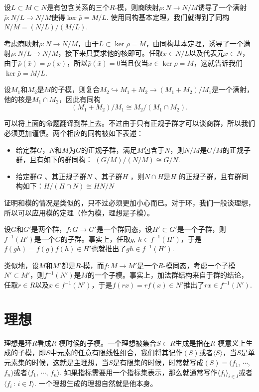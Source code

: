 \para 设$L\subset M \subset N$是有包含关系的三个$R$-模，则商映射$\rho:N\to N/M$诱导了一个满射$\bar{\rho}:N/L \to N/M$使得$\ker \bar{\rho}=M/L$. 使用同构基本定理，我们就得到了同构$N/M=(N/L)/(M/L)$.

考虑商映射$\rho:N\to N/M$，由于$L\subset \ker \rho=M$，由同构基本定理，诱导了一个满射$\bar{\rho}:N/L \to N/M$，接下来只要求他的核即可。任取$\bar{x}\in N/L$以及代表元$x\in N$，由于$\bar{\rho}(\bar{x})=\rho(x)$，所以$\bar{\rho} (\bar{x})=0$当且仅当$x\in \ker \rho =M$，这就告诉我们$\ker \bar{\rho}=M/L$.

\para \label{modiso1}设$M_1$和$M_2$是$M$的子模，则复合$M_2\hookrightarrow M_1+M_2 \to (M_1+M_2)/M_1$是一个满射，他的核是$M_1\cap M_2$，因此有同构
\[
	(M_1+M_2)/M_1\cong M_2/(M_1\cap M_2).
\]

\para 可以将上面的命题翻译到群上去。不过由于只有正规子群才可以谈商群，所以我们必须更加谨慎。两个相应的同构被如下表述：

\begin{itemize}
\item 给定群$G$，$N$和$M$为$G$的正规子群，满足$M$包含于$N$，则$N/M$是$G/M$的正规子群，且有如下的群同构： $ (G/M)/(N/M)\cong G/N$.

\item 给定群$G$ 、其正规子群$N$ 、其子群$H$ ，则$N\cap H$是$H$ 的正规子群，且有群同构如下：$H/(H\cap N)\cong HN/N$
\end{itemize}

证明和模的情况是类似的，只不过必须更加小心而已。对于环，我们一般谈理想，所以可以应用模的定理（作为模，理想是子模）。

\para 设$G$和$G'$是两个群，$f:G\to G'$是一个群同态，设$H'\subset G'$是一个子群，则$f^{-1}(H')$是一个$G$的子群。事实上，任取$g$, $h\in f^{-1}(H')$，于是$f(gh)=f(g)f(h)\in H'$也就推出了$gh\in f^{-1}(H')$. 

类似地，设$M$和$M'$都是$R$-模，而$f:M\to M'$是一个$R$-模同态，考虑一个子模$N'\subset M'$，则$f^{-1}(N')$是$M$的一个子模。事实上，加法群结构来自于群的结论，任取$r\in R$以及$x\in f^{-1}(N')$，于是$f(rx)=rf(x)\in N'$推出了$rx\in f^{-1}(N')$. 

\section{理想}

\para[理想] 理想是环$R$看成$R$-模时候的子模。一个理想被集合$S\subset R$生成是指在$R$-模意义上生成的子模，即$S$中元素的任意有限线性组合，我们将其记作$(S)$或者$\langle S\rangle$，当$S$是单元素集的时候，这就是主理想，当$S$是有限集的时候，时常就写成$(S)=(f_1$, $\cdots$, $f_n)$或者$\langle f_1$, $\cdots$, $f_n\rangle$. 如果指标需要用一个指标集表示，那么就通常写作$\langle f_i\rangle_{i\in I}$或者$\langle f_i\,:\,i\in I\rangle$. 一个理想生成的理想自然就是他本身。\endpara

